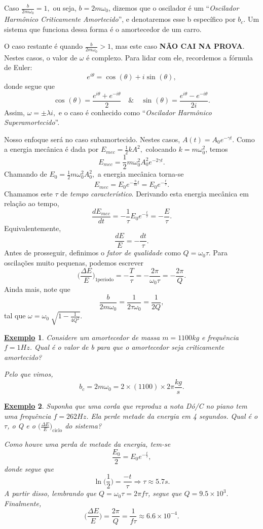 \documentclass{article}
\newtheorem{example}{\underline{Exemplo}}
\begin{document}
  Caso \(\frac{b}{2m\omega_{0}} = 1,\) ou seja, \(b = 2m\omega_{0}\), dizemos que o oscilador é um 
``\textit{Oscilador Harmônico Criticamente Amortecido}'', e denotaremos esse b específico por \(b_{c}.\) 
Um sistema que funciona dessa forma é o amortecedor de um carro.
  
  O caso restante é quando \(\frac{b}{2m\omega_{0}} > 1\), mas este caso \textbf{NÃO CAI NA PROVA}. Nestes casos,
o valor de \(\omega \) é complexo. Para lidar com ele, recordemos a fórmula de Euler: 
  \[
    e^{i \theta } = \cos^{}{(\theta )} + i\sin^{}{(\theta )},
  \]
donde segue que 
  \[
    \cos^{}{(\theta )} = \frac{e^{i\theta }+e^{-i\theta }}{2}\quad\&\quad \sin^{}{(\theta )} = \frac{e^{i\theta }-e^{-i\theta }}{2i}.
  \]
  Assim, \(\omega = \pm \lambda i,\) e o caso é conhecido como ``\textit{Oscilador Harmônico Superamortecido}''.

  Nosso enfoque será no caso subamortecido. Nestes casos, \(A(t) = A_{0}e^{-\gamma t}.\) Como 
a energia mecânica é dada por \(E_{mec} = \frac{1}{2}kA^{2},\) colocando \(k=m\omega_{0}^{2}\), temos 
  \[
    E_{mec} = \frac{1}{2}m\omega_{0}^{2}A_{0}^{2}e^{-2\gamma t}.
  \]
Chamando de \(E_{0} = \frac{1}{2}m\omega_{0}^{2}A_{0}^{2},\) a energia mecânica torna-se 
  \[
    E_{mec} = E_{0}e^{-\frac{b}{m}t} = E_{0}e^{-\frac{t}{\tau }}.
  \]
  Chamamos este \(\tau \) de \textit{tempo característico}. Derivando esta energia mecânica em relação ao tempo, 
  \[
    \frac{dE_{mec}}{dt} = -\frac{1}{\tau }E_{0} e^{-\frac{t}{\tau }} = -\frac{E}{\tau }.
  \]
  Equivalentemente, 
  \[
    \frac{dE}{E} = -\frac{dt}{\tau }.
  \]
  Antes de prosseguir, definimos o \textit{fator de qualidade} como \(Q = \omega_{0}\tau \). Para
oscilações muito pequenas, podemos escrever 
  \[
    \biggl(\frac{\Delta E}{E}\biggr)_{1\text{período}} = -\frac{T}{\tau } = -\frac{2\pi }{\omega_{0}\tau } = -\frac{2\pi }{Q}.
  \]
  Ainda mais, note que 
  \[
    \frac{b}{2m\omega_{0}} = \frac{1}{2\tau \omega_{0}} = \frac{1}{2Q}, 
  \]
  tal que \(\omega = \omega_{0}\sqrt[]{1 - \frac{1}{4Q^{2}}}\).
\begin{example}
  Considere um amortecedor de massa \(m=1100kg\) e frequência \(f = 1Hz\). Qual é o valor de b para que o amortecedor
seja criticamente amortecido?

  Pelo que vimos, 
    \[
      b_{c} = 2m\omega_{0} = 2\times(1100)\times 2\pi \frac{kg}{s}.
    \]
\end{example}
\begin{example}
  Suponha que uma corda que reproduz a nota Dó/C no piano tem uma frequência \(f = 262Hz\). Ela perde metade
  da energia em 4 segundos. Qual é o \(\tau \), o Q e o \(\biggl(\frac{\Delta E}{E}\biggr)_{\text{ciclo}}\) do sistema?

  Como houve uma perda de metade da energia, tem-se 
    \[
      \frac{E_{0}}{2} = E_{0}e^{-\frac{t}{\tau }},
    \]
  donde segue que 
    \[
      \ln \biggl(\frac{1}{2}\biggr) = \frac{-t}{\tau } \Rightarrow \tau \approx 5.7s.
    \]
    A partir disso, lembrando que \(Q = \omega_{0}\tau  = 2\pi f \tau \), segue que \(Q = 9.5\times 10^{3}.\) Finalmente, 
      \[
        \biggl(\frac{\Delta E}{E}\biggr) = \frac{2\pi }{Q} = \frac{1}{f\tau }\approx 6.6\times 10^{-4}.
      \]
\end{example}
\end{document}
